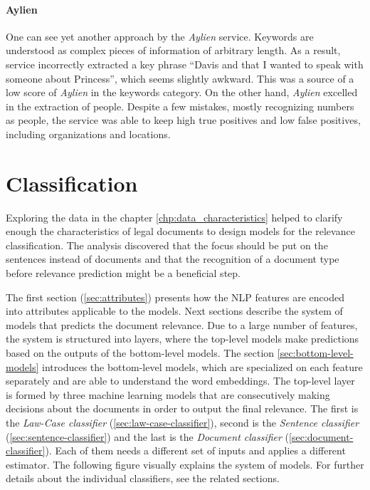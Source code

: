 \documentclass[
  digital, %
  notable,   %
  nolof,     %
  nolot,     %
]{fithesis3}
\begin{document}
\subsubsection{\textbf{Aylien}}
One can see yet another approach by the \textit{Aylien} service.
Keywords are understood as complex pieces of information of arbitrary length.
As a result, service incorrectly extracted a key phrase ``Davis and that I wanted to speak with someone about Princess'', which seems slightly awkward.
This was a source of a low score of \textit{Aylien} in the keywords category.
On the other hand, \textit{Aylien} excelled in the extraction of people.
Despite a few mistakes, mostly recognizing numbers as people, the service was able to keep high true positives and low false positives, including organizations and locations.

\chapter{Classification}
\label{chp:classification}
Exploring the data in the chapter \ref{chp:data_characteristics} helped to clarify enough the characteristics of legal documents to design models for the relevance classification.
The analysis discovered that the focus should be put on the sentences instead of documents and that the recognition of a document type before relevance prediction might be a beneficial step.

The first section (\ref{sec:attributes}) presents how the NLP features are encoded into attributes applicable to the models.
Next sections describe the system of models that predicts the document relevance.
Due to a large number of features, the system is structured into layers, where the top-level models make predictions based on the outputs of the bottom-level models.
The section \ref{sec:bottom-level-models} introduces the bottom-level models, which are specialized on each feature separately and are able to understand the word embeddings.
The top-level layer is formed by three machine learning models that are consecutively making decisions about the documents in order to output the final relevance.
The first is the \textit{Law-Case classifier} (\ref{sec:law-case-classifier}), second is the \textit{Sentence classifier} (\ref{sec:sentence-classifier}) and the last is the \textit{Document classifier} (\ref{sec:document-classifier}).
Each of them needs a different set of inputs and applies a different estimator.
The following figure visually explains the system of models.
For further details about the individual classifiers, see the related sections.
\end{document}
